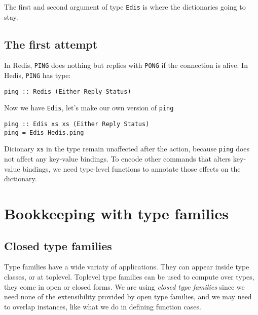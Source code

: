 \documentclass[pldi]{sigplanconf-pldi16}
\begin{document}
The first and second argument of type \texttt{Edis} is where the
dictionaries going to stay.

\subsection{The first attempt}

In Redis, \texttt{PING} does nothing but replies with
\texttt{PONG} if the connection is alive. In Hedis,
\texttt{PING} has type:

\begin{verbatim}
ping :: Redis (Either Reply Status)
\end{verbatim}

Now we have \texttt{Edis}, let's make our own version of
\texttt{ping}\footnotemark

\begin{verbatim}
ping :: Edis xs xs (Either Reply Status)
ping = Edis Hedis.ping
\end{verbatim}

Dicionary \texttt{xs} in the type remain unaffected after the
action, because \texttt{ping} does not affect any key-value
bindings. To encode other commands that alters key-value bindings, we need
 type-level functions to annotate those effects on the dictionary.

\section{Bookkeeping with type families}
\subsection{Closed type families}

Type families have a wide variaty of applications. They can appear inside type
classes\cite{tfclass}\cite{tfsynonym}, or at toplevel. Toplevel type families
can be used to compute over types, they come in open\cite{tfopen} or closed
forms\cite{tfclosed}. We are using \emph{closed type families} since we need
none of the extensibility provided by open type families, and we may need to
overlap instances, like what we do in defining function cases.

%
%
\end{document}
